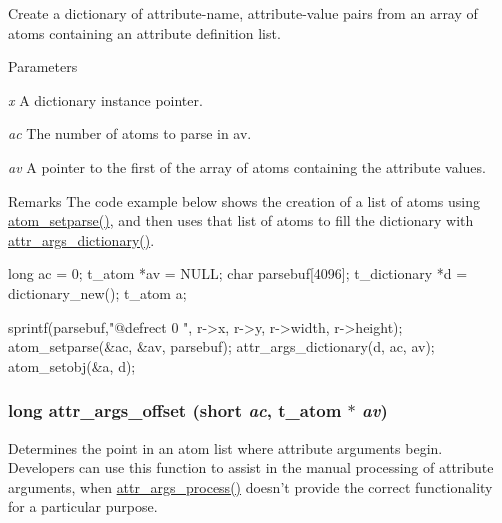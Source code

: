 Create a dictionary of attribute-\/name, attribute-\/value pairs from an array of atoms containing an attribute definition list. 
\begin{DoxyParams}{Parameters}
\item[{\em x}]A dictionary instance pointer. \item[{\em ac}]The number of atoms to parse in av. \item[{\em av}]A pointer to the first of the array of atoms containing the attribute values.\end{DoxyParams}
\begin{DoxyRemark}{Remarks}
The code example below shows the creation of a list of atoms using \hyperlink{group__atom_ga55938aedb41a8f3565680cf29169dc70}{atom\_\-setparse()}, and then uses that list of atoms to fill the dictionary with \hyperlink{group__attr_gad9de140db1dba2fe588019866a048bc6}{attr\_\-args\_\-dictionary()}. 
\begin{DoxyCode}
    long ac = 0;
    t_atom *av = NULL;
    char parsebuf[4096];
    t_dictionary *d = dictionary_new();
    t_atom a;
    
    sprintf(parsebuf,"@defrect %
      0 ", r->x, r->y, r->width, r->height);
    atom_setparse(&ac, &av, parsebuf);
    attr_args_dictionary(d, ac, av);
    atom_setobj(&a, d);
\end{DoxyCode}
 
\end{DoxyRemark}
\hypertarget{group__attr_gad43de348be384066030e14ac22c803ea}{
\subsubsection[{attr\_\-args\_\-offset}]{\setlength{\rightskip}{0pt plus 5cm}long attr\_\-args\_\-offset (short {\em ac}, \/  {\bf t\_\-atom} $\ast$ {\em av})}}
\label{group__attr_gad43de348be384066030e14ac22c803ea}


Determines the point in an atom list where attribute arguments begin. Developers can use this function to assist in the manual processing of attribute arguments, when \hyperlink{group__attr_ga6818c20859f69d6c4acd289e07340db1}{attr\_\-args\_\-process()} doesn't provide the correct functionality for a particular purpose.


